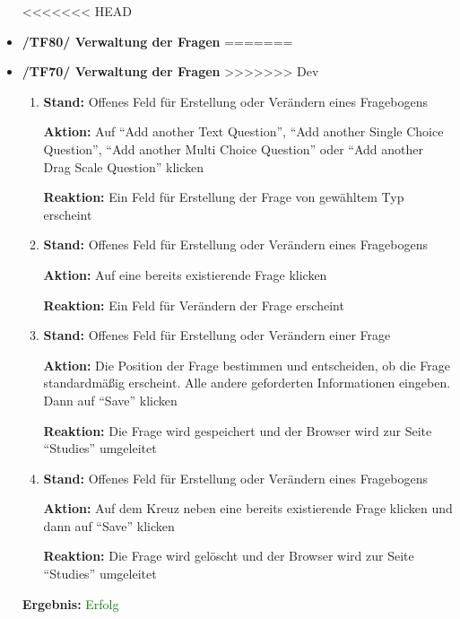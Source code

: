 \documentclass[a4paper]{scrreprt}
\begin{document}
\begin{itemize}
<<<<<<< HEAD
		                      \item \textbf{/TF80/ Verwaltung der Fragen}
=======
		                      \item \textbf{/TF70/ Verwaltung der Fragen}
>>>>>>> Dev
		                              \begin{enumerate}
		                              \item \par \textbf{Stand: }Offenes Feld f\"ur Erstellung oder Ver\"andern eines Fragebogens
		                                    \par \textbf{Aktion: }Auf ``Add another Text Question'', ``Add another Single Choice Question'', ``Add another Multi Choice Question'' oder ``Add another Drag Scale Question'' klicken
		                                    \par \textbf{Reaktion: }Ein Feld f\"ur Erstellung der Frage von gew\"ahltem Typ erscheint
		                              \item \par \textbf{Stand: }Offenes Feld f\"ur Erstellung oder Ver\"andern eines Fragebogens
		                                    \par \textbf{Aktion: }Auf eine bereits existierende Frage klicken
		                                    \par \textbf{Reaktion: }Ein Feld f\"ur Ver\"andern der Frage erscheint
		                              \item \par \textbf{Stand: }Offenes Feld f\"ur Erstellung oder Ver\"andern einer Frage
		                                    \par \textbf{Aktion: }Die Position der Frage bestimmen und entscheiden, ob die Frage standardm\"aßig erscheint. Alle andere geforderten Informationen eingeben. Dann auf ``Save'' klicken
		                                    \par \textbf{Reaktion: }Die Frage wird gespeichert und der Browser wird zur Seite ``Studies'' umgeleitet
		                              \item \par \textbf{Stand: }Offenes Feld f\"ur Erstellung oder Ver\"andern eines Fragebogens
		                                    \par \textbf{Aktion: }Auf dem Kreuz neben eine bereits existierende Frage klicken und dann auf ``Save'' klicken
		                                    \par \textbf{Reaktion: }Die Frage wird gel\"oscht und der Browser wird zur Seite ``Studies'' umgeleitet
		                          \end{enumerate}
		      					\vspace*{0.3cm}
		      		           \par \textbf{Ergebnis: }\textcolor{green}{Erfolg}
		      		           \vspace*{0.6cm}
		

\end{itemize}
\end{document}
